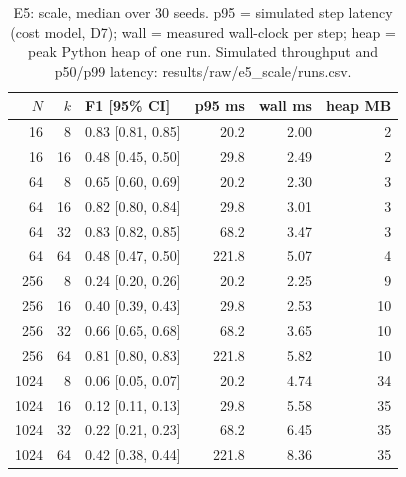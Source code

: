 \begin{table}[t]
\centering\footnotesize\setlength{\tabcolsep}{4pt}
\caption{E5: scale, median over 30 seeds. p95 = simulated step latency (cost model, D7); wall = measured wall-clock per step; heap = peak Python heap of one run. Simulated throughput and p50/p99 latency: results/raw/e5\_scale/runs.csv.}\label{tab:e5}
\begin{tabular}{rrlrrr}
\toprule
$N$ & $k$ & F1 [95\% CI] & p95 ms & wall ms & heap MB \\
\midrule
16 & 8 & 0.83 [0.81, 0.85] & 20.2 & 2.00 & 2 \\
16 & 16 & 0.48 [0.45, 0.50] & 29.8 & 2.49 & 2 \\
64 & 8 & 0.65 [0.60, 0.69] & 20.2 & 2.30 & 3 \\
64 & 16 & 0.82 [0.80, 0.84] & 29.8 & 3.01 & 3 \\
64 & 32 & 0.83 [0.82, 0.85] & 68.2 & 3.47 & 3 \\
64 & 64 & 0.48 [0.47, 0.50] & 221.8 & 5.07 & 4 \\
256 & 8 & 0.24 [0.20, 0.26] & 20.2 & 2.25 & 9 \\
256 & 16 & 0.40 [0.39, 0.43] & 29.8 & 2.53 & 10 \\
256 & 32 & 0.66 [0.65, 0.68] & 68.2 & 3.65 & 10 \\
256 & 64 & 0.81 [0.80, 0.83] & 221.8 & 5.82 & 10 \\
1024 & 8 & 0.06 [0.05, 0.07] & 20.2 & 4.74 & 34 \\
1024 & 16 & 0.12 [0.11, 0.13] & 29.8 & 5.58 & 35 \\
1024 & 32 & 0.22 [0.21, 0.23] & 68.2 & 6.45 & 35 \\
1024 & 64 & 0.42 [0.38, 0.44] & 221.8 & 8.36 & 35 \\
\bottomrule
\end{tabular}
\end{table}
